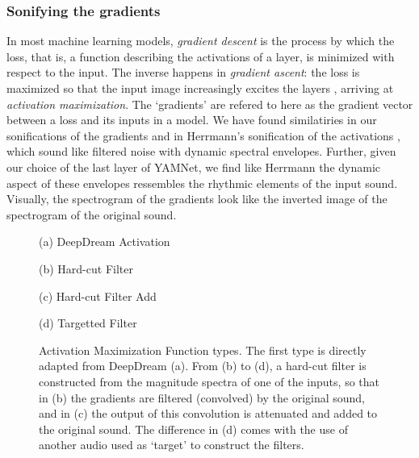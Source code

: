 \documentclass[a4paper,10pt,oneside]{article}
\begin{document}
\begin{sloppy}
\subsubsection{Sonifying the gradients}
\label{subsec:gradients}
In most machine learning models, \textit{gradient descent} is the process by which the loss, that is, a function describing the activations of a layer, is minimized with respect to the input. The inverse happens in \textit{gradient ascent}: the loss is maximized so that the input image increasingly excites the layers \cite{DeepDreamTutorial}, arriving at \textit{activation maximization}. The `gradients' are refered to here as the gradient vector between a loss and its inputs in a model. We have found similatiries in our sonifications of the gradients and in Herrmann's sonification of the activations \cite{pmlr-v123-herrmann20a}, which sound like filtered noise with dynamic spectral envelopes. Further, given our choice of the last layer of YAMNet, we find like Herrmann the dynamic aspect of these envelopes ressembles the rhythmic elements of the input sound. Visually, the spectrogram of the gradients look like the inverted image of the spectrogram of the original sound.

\begin{figure}[h]
\begin{minipage}[h]{0.5\columnwidth}
  \centerline{}
  \centerline{(a) DeepDream Activation}\medskip
\end{minipage}
\begin{minipage}[h]{0.5\columnwidth}
  \centerline{}
  \centerline{(b) Hard-cut Filter}\medskip
\end{minipage}
\begin{minipage}[h]{0.5\columnwidth}
  \centerline{}
  \centerline{(c) Hard-cut Filter Add}\medskip
\end{minipage}
\begin{minipage}[h]{0.5\columnwidth}
  \centerline{}
  \centerline{(d) Targetted Filter }\medskip
\end{minipage}
\caption{Activation Maximization Function types. The first type is directly adapted from DeepDream (a). From (b) to (d), a hard-cut filter is constructed from the magnitude spectra of one of the inputs, so that in (b) the gradients are filtered (convolved) by the original sound, and in (c) the output of this convolution is attenuated and added to the original sound. The difference in (d) comes with the use of another audio used as `target' to construct the filters.}
\label{fig:maxfun}
\end{figure}


\end{sloppy}
\end{document}
